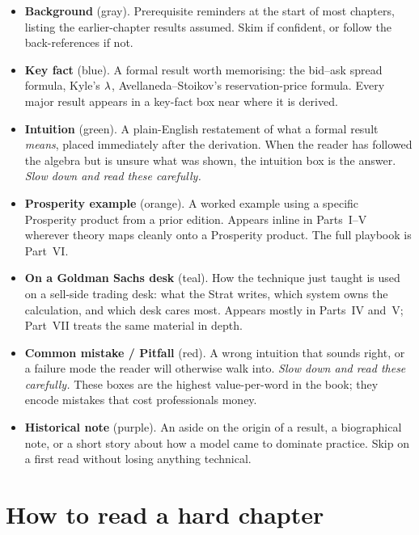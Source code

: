 \begin{itemize}
\item \textbf{Background} (gray). Prerequisite reminders at the start
of most chapters, listing the earlier-chapter results assumed. Skim if
confident, or follow the back-references if not.

\item \textbf{Key fact} (blue). A formal result worth memorising:
the bid--ask spread formula, Kyle's $\lambda$, Avellaneda--Stoikov's
reservation-price formula. Every major result appears in a key-fact
box near where it is derived.

\item \textbf{Intuition} (green). A plain-English restatement of what a
formal result \emph{means}, placed immediately after the derivation.
When the reader has followed the algebra but is unsure what was
shown, the intuition box is the answer. \emph{Slow down and read these
carefully.}

\item \textbf{Prosperity example} (orange). A worked example using a
specific Prosperity product from a prior edition. Appears inline in
Parts~I--V wherever theory maps cleanly onto a Prosperity product. The
full playbook is Part~VI.

\item \textbf{On a Goldman Sachs desk} (teal). How the technique just
taught is used on a sell-side trading desk: what the Strat writes,
which system owns the calculation, and which desk cares most. Appears
mostly in Parts~IV and~V; Part~VII treats the same material in depth.

\item \textbf{Common mistake / Pitfall} (red). A wrong intuition that
sounds right, or a failure mode the reader will otherwise walk into.
\emph{Slow down and read these carefully.} These boxes are the highest
value-per-word in the book; they encode mistakes that cost
professionals money.

\item \textbf{Historical note} (purple). An aside on the origin of a
result, a biographical note, or a short story about how a model came
to dominate practice. Skip on a first read without losing anything
technical.
\end{itemize}

\section{How to read a hard chapter}
\label{sec:hard_chapters}

